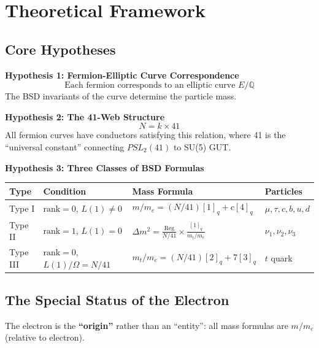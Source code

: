 ﻿\documentclass[11pt,a4paper]{article}
\theoremstyle{definition}
\begin{document}
\section{Theoretical Framework}

\subsection{Core Hypotheses}

\textbf{Hypothesis 1: Fermion-Elliptic Curve Correspondence}
\begin{equation}
    \text{Each fermion corresponds to an elliptic curve } E/\mathbb{Q}
\end{equation}
The BSD invariants of the curve determine the particle mass.

\textbf{Hypothesis 2: The 41-Web Structure}
\begin{equation}
    N = k \times 41
\end{equation}
All fermion curves have conductors satisfying this relation, where 41 is the ``universal constant'' connecting $PSL_2(41)$ to SU(5) GUT.

\textbf{Hypothesis 3: Three Classes of BSD Formulas}
\begin{table}[h]
\centering
\begin{tabular}{@{}llll@{}}
\toprule
\textbf{Type} & \textbf{Condition} & \textbf{Mass Formula} & \textbf{Particles} \\
\midrule
Type I & $\text{rank}=0$, $L(1) \neq 0$ & $m/m_e = (N/41)[1]_q + c[4]_q$ & $\mu, \tau, c, b, u, d$ \\
Type II & $\text{rank}=1$, $L(1)=0$ & $\Delta m^2 = \frac{\text{Reg}}{N/41} \times \frac{[1]_q}{m_t/m_e}$ & $\nu_1, \nu_2, \nu_3$ \\
Type III & $\text{rank}=0$, $L(1)/\Omega=N/41$ & $m_t/m_e = (N/41)[2]_q + 7[3]_q$ & $t$ quark \\
\bottomrule
\end{tabular}
\end{table}

\subsection{The Special Status of the Electron}
The electron is the \textbf{``origin''} rather than an ``entity'': all mass formulas are $m/m_e$ (relative to electron).
\end{document}
